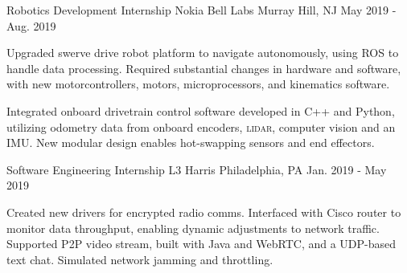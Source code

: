 \begin{cventries}
  \cventry
  {Robotics Development Internship} %
  {Nokia Bell Labs} %
  {Murray Hill, NJ} %
  {May 2019 - Aug. 2019} %
  {
    \begin{cvitems} %
      \item {Upgraded swerve drive robot platform to navigate autonomously, using ROS to handle data processing. Required substantial changes in hardware and software, with new motorcontrollers, motors, microprocessors, and kinematics software.}
      \item {Integrated onboard drivetrain control software developed in C++ and Python, utilizing odometry data from onboard encoders, \textsc{lidar}, computer vision and an IMU. New modular design enables hot-swapping sensors and end effectors.}
    \end{cvitems}
  }

  \cventry
  {Software Engineering Internship} %
  {L3 Harris} %
  {Philadelphia, PA} %
  {Jan. 2019 - May 2019} %
  {
    \begin{cvitems} %
      \item {Created new drivers for encrypted radio comms. Interfaced with Cisco router to monitor data throughput, enabling dynamic adjustments to network traffic. Supported P2P video stream, built with Java and WebRTC, and a UDP-based text chat. Simulated network jamming and throttling.}
    \end{cvitems}
  }


\end{cventries}
